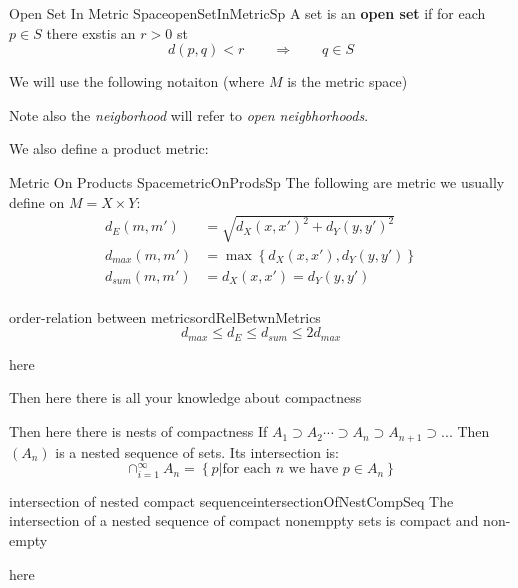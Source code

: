 \documentclass{book}
\newcommand{\Rw}{\Rightarrow}
\newcommand{\oln}[1]{{\overline{#1}}}
\renewcommand{\bf}[1]{\textbf{#1}}
\newenvironment{Proof}[1][]
  {\begin{ProofTcb}[#1]}
  {\end{ProofTcb}}
\begin{document}
\begin{defn}{Open Set In Metric Space}{openSetInMetricSp}
	A set is an \bf{open set} if for each $p \in S$ there exstis an $r > 0$ st
	\[
		d(p,q) < r \qquad \Rw \qquad q \in S
	\]
\end{defn}

We will use the following notaiton (where $M$ is the metric space)

Note also the \emph{neigborhood} will refer to \emph{open neigbhorhoods}.

We also define a product metric:
\begin{defn}{Metric On Products Space}{metricOnProdsSp}
	The following are metric we usually define on $M = X\times Y$:
	\begin{align*}
		d_E(m, m') &= \sqrt{d_X(x,x')^2 + d_Y(y,y')^2}\\
		d_{max}(m, m') &= \max \left\{ d_X(x,x'), d_Y(y,y') \right\}\\
		d_{sum}(m, m') &= d_X(x,x') = d_Y(y,y')\\
	\end{align*}
\end{defn}

\begin{prop}{order-relation between metrics}{ordRelBetwnMetrics}
	\[
		d_{max} \le d_E \le d_{sum} \le 2d_{max}
	\]
\end{prop}

\begin{Proof}
	here
\end{Proof}

Then here there is all your knowledge about compactness

Then here there is nests of compactness
If $A_1 \supset A_2 \cdots \supset A_n \supset A_{n+1} \supset ... $ Then $(A_n)$ is a nested sequence of sets. Its
intersection is:
\[
	\cap_{i=1}^\infty A_n = \left\{ p | \text{for each $n$ we have $p \in A_n$} \right\}
\]

\begin{thm}{intersection of nested compact sequence}{intersectionOfNestCompSeq}
	The intersection of a nested sequence of compact nonemppty sets is compact and non-empty
\end{thm}

\begin{Proof}
	here
\end{Proof}
\end{document}
